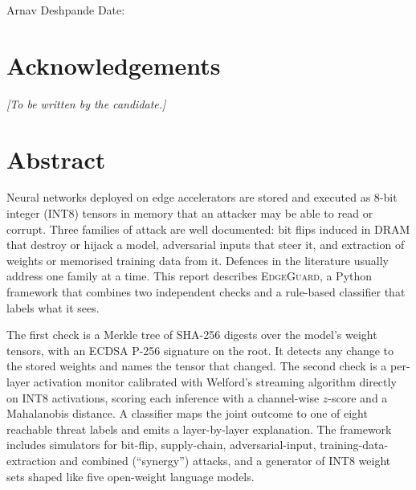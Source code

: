 \vspace{1.5cm}
\noindent Arnav Deshpande \hfill Date: \underline{\hspace{3cm}}

\chapter*{Acknowledgements}
\textit{[To be written by the candidate.]}

\chapter*{Abstract}

Neural networks deployed on edge accelerators are stored and executed as 8-bit integer (INT8)
tensors in memory that an attacker may be able to read or corrupt. Three families of attack
are well documented: bit flips induced in DRAM that destroy or hijack a model, adversarial
inputs that steer it, and extraction of weights or memorised training data from it. Defences
in the literature usually address one family at a time. This report describes
\textsc{EdgeGuard}, a Python framework that combines two independent checks and a rule-based
classifier that labels what it sees.

The first check is a Merkle tree of SHA-256 digests over the model's weight tensors, with an
ECDSA P-256 signature on the root. It detects any change to the stored weights and names the
tensor that changed. The second check is a per-layer activation monitor calibrated with
Welford's streaming algorithm directly on INT8 activations, scoring each inference with a
channel-wise $z$-score and a Mahalanobis distance. A classifier maps the joint outcome to one of
eight reachable threat labels and emits a layer-by-layer explanation. The framework includes
simulators for bit-flip, supply-chain, adversarial-input, training-data-extraction and combined
(``synergy'') attacks, and a generator of INT8 weight sets shaped like five open-weight
language models.

